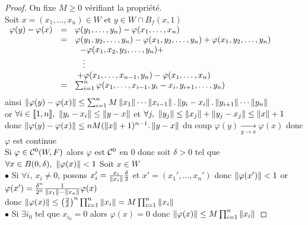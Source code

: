 		\begin{proof}
		\fbox{$\Leftarrow$} On fixe $M\geq 0$ vérifiant la propriété. \\
		Soit $x=(x_1 ,\dots ,x_n)\in W$ et $y\in W\cap B_f(x,1)$ \\
		$\begin{array}{ll}
			\varphi (y) - \varphi (x) & =~~\varphi (y_1 ,\dots , y_n) - \varphi (x_1 ,\dots , x_n) \\ 
			&=~~\varphi (y_1 ,y_2,\dots , y_n) - \varphi (x_1,y_2 ,\dots , y_n) + \varphi (x_1,y_2 ,\dots , y_n) \\
			&~~~~~~~ - \varphi (x_1,x_2,y_3,\dots ,y_n) + \\ 
			&~~~~~~~~\vdots \\ 
			&~~~~~~+ \varphi (x_1 ,\dots ,x_{n-1}, y_n) - \varphi (x_1 ,\dots , x_n) \\
			&=~~\sum_{i=1}^n \varphi (x_1,\dots ,x_{i-1} , y_i - x_i ,y_{i+1},\dots , y_n) \vspace*{0.2cm} 
		\end{array}$\\
		ainsi $\left\Vert \varphi (y) - \varphi (x) \right\Vert \leq \sum_{i=1}^n M \left\Vert x_1 \right\Vert\cdots\left\Vert x_{i-1} \right\Vert.\left\Vert y_i - x_i \right\Vert.\left\Vert y_{i+1} \right\Vert\cdots\left\Vert y_n \right\Vert$ \\ 
		or $\forall i\in {\llbracket 1,n \rrbracket} ,~ \left\Vert y_i-x_i \right\Vert \leq \left\Vert y-x \right\Vert$ et $\forall j ,~\left\Vert y_j \right\Vert \leq \left\Vert x_j \right\Vert + \left\Vert y_j - x_j \right\Vert \leq \left\Vert x \right\Vert + 1$ \\
		donc $\left\Vert \varphi (y) - \varphi (x) \right\Vert \leq nM(\left\Vert x \right\Vert + 1)^{n-1} .\left\Vert y-x \right\Vert$ du coup $\varphi (y) \underset{y\rightarrow x}{\longrightarrow} \varphi (x)$ donc $\varphi$ est continue\\ 
		\fbox{$\Rightarrow$} Si $\varphi \in{\mathcal{C}}^0(W,F)$ alors $\varphi$ est ${\mathcal{C}}^0$ en $0$ donc soit $\delta>0$ tel que $\forall x\in B(0,\delta ) ,~\left\Vert \varphi (x) \right\Vert <1$ Soit $x\in W$\\
		$\bullet$ Si $\forall i , ~x_i \neq 0$, posons $x_i' = \frac{x_i}{\left\Vert x_i \right\Vert}\frac{\delta}{2}$ et $x' = (x_1',\dots ,x_n')$ donc $\left\Vert \varphi (x') \right\Vert <1$ or $\varphi (x') = \frac{\delta^n}{2^n}\frac{1}{\left\Vert x_1 \right\Vert\cdots\left\Vert x_n \right\Vert} \varphi (x)$ \\
		donc $\left\Vert \varphi (x)  \right\Vert \leq \left(\frac{2}{\delta}\right)^n \prod_{i=1}^{n} \left\Vert x_i \right\Vert = M \prod_{i=1}^{n} \left\Vert x_i \right\Vert$ \\
		$\bullet$ Si $\exists i_0$ tel que $x_{i_0} =0$ alors $\varphi (x) = 0$ donc $\left\Vert \varphi (x) \right\Vert \leq M\prod_{i=1}^{n} \left\Vert x_i \right\Vert$
		\end{proof} \medskip
		
